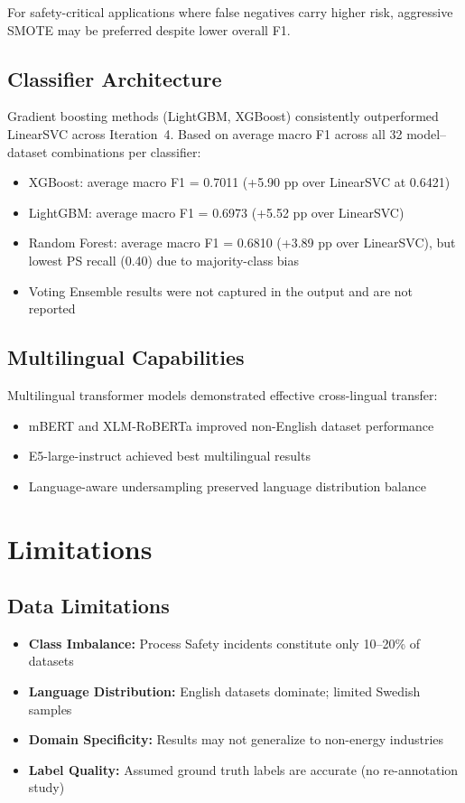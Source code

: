\documentclass[11pt, titlepage, bibliography=totoc]{scrreprt}
\begin{document}
For safety-critical applications where false negatives carry higher risk, aggressive SMOTE may be preferred despite lower overall F1.

\subsection{Classifier Architecture}
Gradient boosting methods (LightGBM, XGBoost) consistently outperformed LinearSVC across Iteration~4. Based on average macro F1 across all 32 model--dataset combinations per classifier:
\begin{itemize}
    \item XGBoost: average macro F1 = 0.7011 (+5.90 pp over LinearSVC at 0.6421)
    \item LightGBM: average macro F1 = 0.6973 (+5.52 pp over LinearSVC)
    \item Random Forest: average macro F1 = 0.6810 (+3.89 pp over LinearSVC), but lowest PS recall (0.40) due to majority-class bias
    \item Voting Ensemble results were not captured in the output and are not reported
\end{itemize}

\subsection{Multilingual Capabilities}
Multilingual transformer models demonstrated effective cross-lingual transfer:
\begin{itemize}
    \item mBERT and XLM-RoBERTa improved non-English dataset performance
    \item E5-large-instruct achieved best multilingual results
    \item Language-aware undersampling preserved language distribution balance
\end{itemize}

\section{Limitations}

\subsection{Data Limitations}
\begin{itemize}
    \item \textbf{Class Imbalance:} Process Safety incidents constitute only 10--20\% of datasets
    \item \textbf{Language Distribution:} English datasets dominate; limited Swedish samples
    \item \textbf{Domain Specificity:} Results may not generalize to non-energy industries
    \item \textbf{Label Quality:} Assumed ground truth labels are accurate (no re-annotation study)
\end{itemize}
\end{document}
